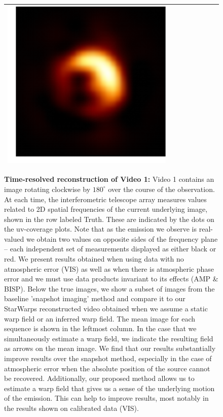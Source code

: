 \begin{figure}[h!]
\begin{center}
\begin{tabular}{  c | c | c  c  c  c  c c }
			\includegraphics[height=0.12\linewidth]{figures/starwarps_results/rotation30/amp-bispectrum_sol1/best/frames/mean_noaxis_29.pdf}  
			\\ \hline  	
		\end{tabular}
		\caption{{\bf Time-resolved reconstruction of Video 1:} Video 1 contains an image rotating clockwise by $180^{\circ}$ over the course of the observation. At each time, the interferometric telescope array measures values related to 2D spatial frequencies of the current underlying image, shown in the row labeled Truth. These are indicated by the dots on the uv-coverage plots. Note that as the emission we observe is real-valued we obtain two values on opposite sides of the frequency plane -- each independent set of measurements displayed as either black or red. We present results obtained when using data with no atmospheric error (VIS) as well as when there is atmospheric phase error and we must use data products invariant to its effects (AMP \& BISP).
		Below the true images, we show a subset of images from the baseline 'snapshot imaging' method and compare it to our StarWarps reconstructed video obtained when we assume a static warp field or an inferred warp field. The mean image for each sequence is shown in the leftmost column. In the case that we simultaneously estimate a warp field, we indicate the resulting field as arrows on the mean image. We find that our results substantially improve results over the snapshot method, especially in the case of atmospheric error when the absolute position of the source cannot be recovered. Additionally, our proposed method allows us to estimate a warp field that gives us a sense of the underlying motion of the emission. This can help to improve results, most notably in the results shown on calibrated data (VIS). }
		\label{fig:rotation_example1}
	\end{center}
\end{figure}
